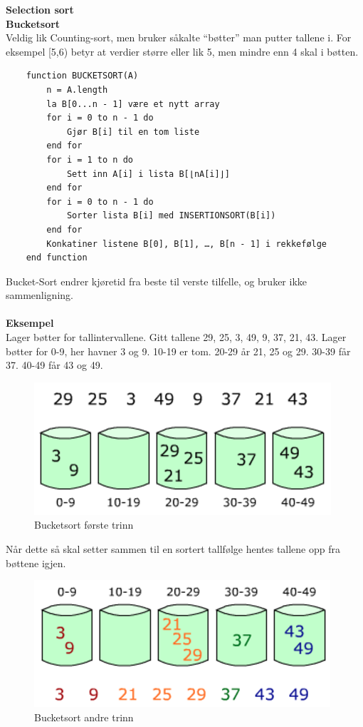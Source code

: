 \noindent \textbf{Selection sort}\\







\noindent \textbf{Bucketsort}\\
Veldig lik Counting-sort, men bruker såkalte “bøtter” man putter tallene i. For eksempel [5,6) betyr at verdier større eller lik 5, men mindre enn 4 skal i bøtten.

\begin{lstlisting}
    function BUCKETSORT(A)
	    n = A.length
	    la B[0...n - 1] være et nytt array
	    for i = 0 to n - 1 do
	    	Gjør B[i] til en tom liste
	    end for
	    for i = 1 to n do
    		Sett inn A[i] i lista B[⌊nA[i]⌋]
    	end for
	    for i = 0 to n - 1 do
		    Sorter lista B[i] med INSERTIONSORT(B[i])
	    end for
	    Konkatiner listene B[0], B[1], …, B[n - 1] i rekkefølge
    end function
\end{lstlisting}

\noindent Bucket-Sort endrer kjøretid fra beste til verste tilfelle, og bruker ikke sammenligning.
\\\\
\noindent \textbf{Eksempel}\\
Lager bøtter for tallintervallene. Gitt tallene 29, 25, 3, 49, 9, 37, 21, 43. Lager bøtter for 0-9, her havner 3 og 9. 10-19 er tom. 20-29 år 21, 25 og 29. 30-39 får 37. 40-49 får 43 og 49.

\begin{figure}[H]
\includegraphics[scale=0.5]{images/bucketsort1}
\centering %
\caption{Bucketsort første trinn}
\label{fig:bucketsort1}
\end{figure}

\noindent Når dette så skal setter sammen til en sortert tallfølge hentes tallene opp fra bøttene igjen.

\begin{figure}[H]
\includegraphics[scale=0.5]{images/bucketsort2}
\centering %
\caption{Bucketsort andre trinn}
\label{fig:bucketsort2}
\end{figure}

